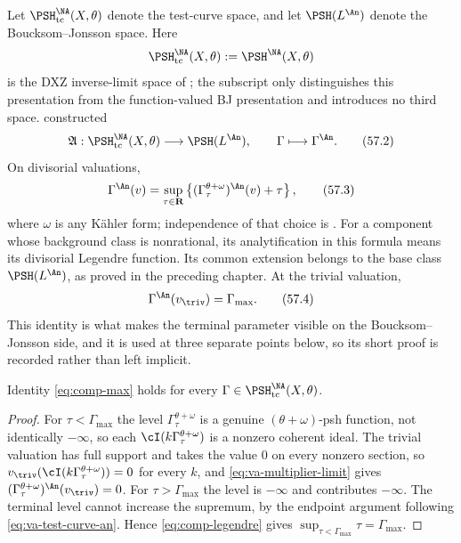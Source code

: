 Let $\PSH^{\NA}_{\mathrm{tc}}(X,\theta)$ denote the test-curve space, and
let $\PSH(L^{\An})$ denote the Boucksom--Jonsson space.
Here
\[
 \PSH^{\NA}_{\mathrm{tc}}(X,\theta)
 :=\PSH^{\NA}(X,\theta)
\]
is the DXZ inverse-limit space of
; the subscript only distinguishes this presentation
from the function-valued BJ presentation and introduces no third space.
 constructed
\[
 \mathfrak A:
 \PSH^{\NA}_{\mathrm{tc}}(X,\theta)
       \longrightarrow\PSH(L^{\An}),
 \qquad
 \Gamma\longmapsto\Gamma^{\An}.
\tag{57.2}\label{eq:comp-map}
\]
On divisorial valuations,
\[
 \Gamma^{\An}(v)
 =\sup_{\tau\in\mathbf R}
       \left\{(\Gamma_\tau^{\theta+\omega})^{\An}(v)+\tau\right\},
\tag{57.3}\label{eq:comp-legendre}
\]
where $\omega$ is any K\"ahler form; independence of that choice is
. For a component whose background
class is nonrational, its analytification in this formula means its
divisorial Legendre function. Its common extension belongs to the base
class $\PSH(L^{\An})$, as proved in the preceding chapter.
At the trivial valuation,
\[
                       \Gamma^{\An}(v_{\triv})=\Gamma_{\max}.
\tag{57.4}\label{eq:comp-max}
\]
This identity is what makes the terminal parameter visible on the
Boucksom--Jonsson side, and it is used at three separate points below, so
its short proof is recorded rather than left implicit.

\begin{lemma}
\label{lem:comp-trivial-valuation}
Identity \eqref{eq:comp-max} holds for every
$\Gamma\in\PSH^{\NA}_{\mathrm{tc}}(X,\theta)$.
\end{lemma}

\begin{proof}
For $\tau<\Gamma_{\max}$ the level $\Gamma_\tau^{\theta+\omega}$ is a
genuine $(\theta+\omega)$-psh function, not identically $-\infty$, so
each $\cI(k\Gamma_\tau^{\theta+\omega})$ is a nonzero coherent ideal.
The trivial valuation has full support and takes the value $0$ on every
nonzero section, so
$v_{\triv}(\cI(k\Gamma_\tau^{\theta+\omega}))=0$ for every $k$, and
\eqref{eq:va-multiplier-limit} gives
$(\Gamma_\tau^{\theta+\omega})^{\An}(v_{\triv})=0$.  For
$\tau>\Gamma_{\max}$ the level is $-\infty$ and contributes
$-\infty$. The terminal level cannot increase the supremum, by the
endpoint argument following \eqref{eq:va-test-curve-an}. Hence
\eqref{eq:comp-legendre} gives
$\sup_{\tau<\Gamma_{\max}}\tau=\Gamma_{\max}$.
\end{proof}

